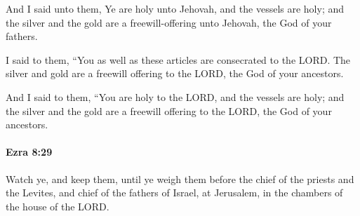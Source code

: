 			\begin{versebox}
					\item[BHS] 
					\item[LXX] 
					\item[ASV] And I said unto them, Ye are holy unto Jehovah, and the vessels are holy; and the silver and the gold are a freewill-offering unto Jehovah, the God of your fathers.
					\item[NIV] I said to them, “You as well as these articles are consecrated to the LORD. The silver and gold are a freewill offering to the LORD, the God of your ancestors.
					\item[NRSV] And I said to them, “You are holy to the LORD, and the vessels are holy; and the silver and the gold are a freewill offering to the LORD, the God of your ancestors.
			\end{versebox}

		\paragraph{Ezra 8:29} %
			\label{EZRA-8-29}

			Watch ye, and keep them, until ye weigh them before the chief of the priests and the Levites, and chief of the fathers of Israel, at Jerusalem, in the chambers of the house of the LORD.

